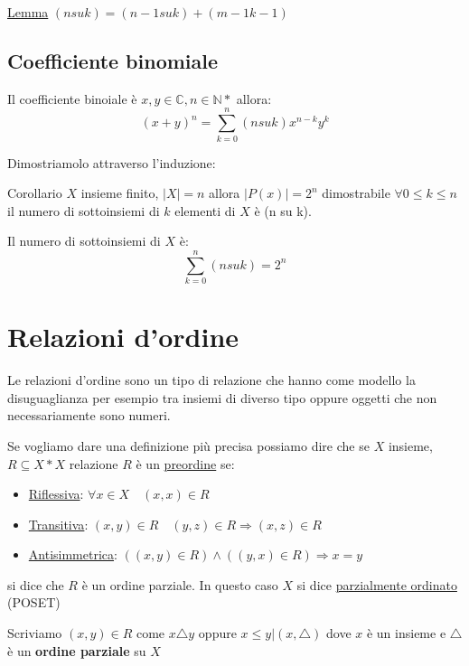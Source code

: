 \documentclass{article}
\theoremstyle{definition}
\begin{document}
\underline{Lemma} $(n su k) = (n-1 su k) + (m-1 k-1)$ 



\subsection{Coefficiente binomiale}
Il coefficiente binoiale è $x,y \in \mathbb{C}, n \in \mathbb{N}*$ allora:
\begin{equation*}
        {(x+y)}^{n} = \sum_{k=0}^{n}(n su k)x^{n-k}y^k
\end{equation*}

Dimostriamolo attraverso l'induzione: \newline
{}

Corollario $X$ insieme finito, $|X| = n$ allora $|P(x)| = 2^n$ dimostrabile $\forall 0 \le k \le n$ il numero di sottoinsiemi di $k$ elementi di $X$ è (n su k). \par
Il numero di sottoinsiemi di $X$ è: 
\begin{equation*}
        \sum_{k=0}^{n}(n su k) = 2^n
\end{equation*}






\newpage
\section{Relazioni d'ordine}
Le relazioni d'ordine sono un tipo di relazione che hanno come modello la disuguaglianza per esempio tra insiemi di diverso tipo oppure oggetti che non necessariamente sono numeri. \par
Se vogliamo dare una definizione più precisa possiamo dire che se $ X $  insieme, $ R \subseteq X * X $ relazione $ R $ è un \underline{preordine} se:
\begin{itemize}
        \item \underline{Riflessiva}: $ \forall x \in X \quad (x,x) \in R$ 
        \item \underline{Transitiva}: $ (x,y) \in R \quad (y,z)  \in R \Rightarrow (x,z) \in R$ 
        \item \underline{Antisimmetrica}: $ ((x,y) \in R) \land ((y,x) \in R) \Rightarrow x = y $ 
\end{itemize}

si dice che $ R $ è un ordine parziale. \newline
In questo caso $ X $ si dice \underline{parzialmente ordinato} (POSET) \par
Scriviamo $ (x,y) \in R $ come $ x \triangle y $ oppure $ x \le y | (x, \triangle)$  dove $x$ è un insieme e $ \triangle $ è un \textbf{ordine parziale} su $ X $    
\end{document}
